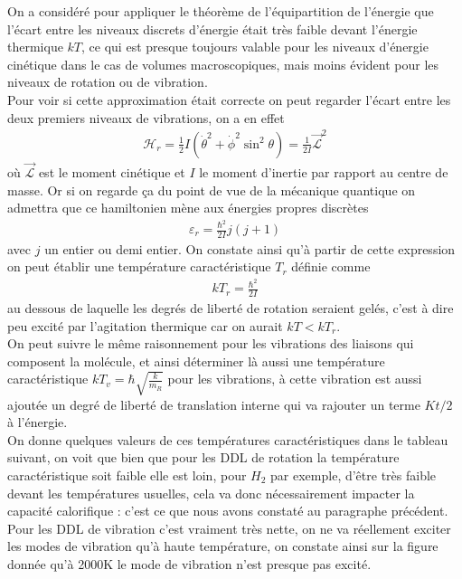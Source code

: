 \documentclass[12pt,prb,aps,epsf]{article}
\begin{document}
On a considéré pour appliquer le théorème de l'équipartition de l'énergie que l'écart entre les niveaux discrets d'énergie était très faible devant l'énergie thermique $kT$, ce qui est presque toujours valable pour les niveaux d'énergie cinétique dans le cas de volumes macroscopiques, mais moins évident pour les niveaux de rotation ou de vibration.\\
Pour voir si cette approximation était correcte on peut regarder l'écart entre les deux premiers niveaux de vibrations, on a en effet 
\begin{eqnarray}
\mathcal{H}_{r}  = \frac{1}{2}I  \left(\dot{\theta}^2 +  \dot{\phi}^2\sin^2\theta\right) = \frac{1}{2I} \vec{\mathcal{L}}^2
\end{eqnarray}
où $\vec{\mathcal{L}}$ est le moment cinétique et $I$ le moment d'inertie par rapport au centre de masse. Or si on regarde ça du point de vue de la mécanique quantique on admettra que ce hamiltonien mène aux énergies propres discrètes 
\begin{eqnarray}
\varepsilon_r = \frac{\hbar^2}{2I}j(j+1)
\end{eqnarray}
avec $j$ un entier ou demi entier. On constate ainsi qu'à partir de cette expression on peut établir une température caractéristique $T_r$ définie comme
\begin{eqnarray}
kT_r = \frac{\hbar^2}{2I}
\end{eqnarray}
au dessous de laquelle les degrés de liberté de rotation seraient gelés, c'est à dire peu excité par l'agitation thermique car on aurait $kT < kT_r$. \\
On peut suivre le même raisonnement pour les vibrations des liaisons qui composent la molécule, et ainsi déterminer là aussi une température caractéristique $kT_v = \hbar \sqrt{\frac{k}{m_R}}$ pour les vibrations, à cette vibration est aussi ajoutée un degré de liberté de translation interne qui va rajouter un terme $Kt/2$ à l'énergie.\\ 
On donne quelques valeurs de ces températures caractéristiques dans le tableau suivant, on voit que bien que pour les DDL de rotation la température caractéristique soit faible elle est loin, pour $H_2$ par exemple, d'être très faible devant les températures usuelles, cela va donc nécessairement impacter la capacité calorifique : c'est ce que nous avons constaté au paragraphe précédent. Pour les DDL de vibration c'est vraiment très nette, on ne va réellement exciter les modes de vibration qu'à haute température, on constate ainsi sur la figure donnée qu'à 2000K le mode de vibration n'est presque pas excité. 
	
\end{document}
